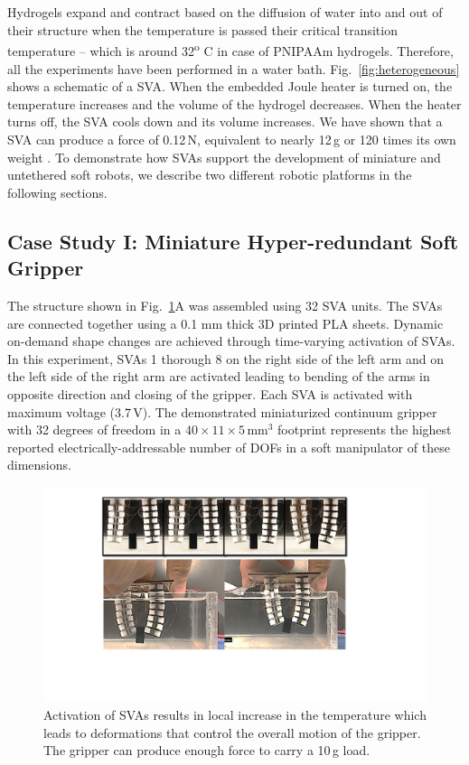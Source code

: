\section{}
Hydrogels expand and contract based on the diffusion of water into and out of their structure when the temperature is passed their critical transition temperature -- which is around 32\textsuperscript{o} C in case of PNIPAAm hydrogels. Therefore, all the experiments have been performed in a water bath. Fig.~\ref{fig:heterogeneous} shows a schematic of a SVA. When the embedded Joule heater is turned on, the temperature increases and the volume of the hydrogel decreases. When the heater turns off, the SVA cools down and its volume increases. We have shown that a SVA can produce a force of 0.12\,N, equivalent to nearly 12\,g or 120 times its own weight \cite{Khodambashi2021}. To demonstrate how SVAs support the development of miniature and untethered soft robots, we describe two different robotic platforms in the following sections. 

\subsection{Case Study I: Miniature Hyper-redundant Soft Gripper}
The structure shown in Fig.~\ref{fig:gripper}A was assembled using 32 SVA units. The SVAs are connected together using a 0.1 mm thick 3D printed PLA sheets. Dynamic on-demand shape changes are achieved through time-varying activation of SVAs. In this experiment, SVAs 1 thorough 8 on the right side of the left arm and on the left side of the right arm are activated leading to bending of the arms in opposite direction and closing of the gripper.
Each SVA is activated with maximum voltage (3.7\,V). The demonstrated miniaturized continuum gripper with 32 degrees of freedom in a $40\times11\times5$\,mm$^3$ footprint represents the highest reported electrically-addressable number of DOFs in a soft manipulator of these dimensions. 
\begin{figure}[!ht]
      \centering
      \includegraphics[width=\textwidth]{gripper.pdf}
      \caption[]{Activation of SVAs results in local increase in the temperature which leads to deformations that control the overall motion of the gripper. The gripper can produce enough force to carry a 10\,g load. }
      \label{fig:gripper}
\end{figure}

